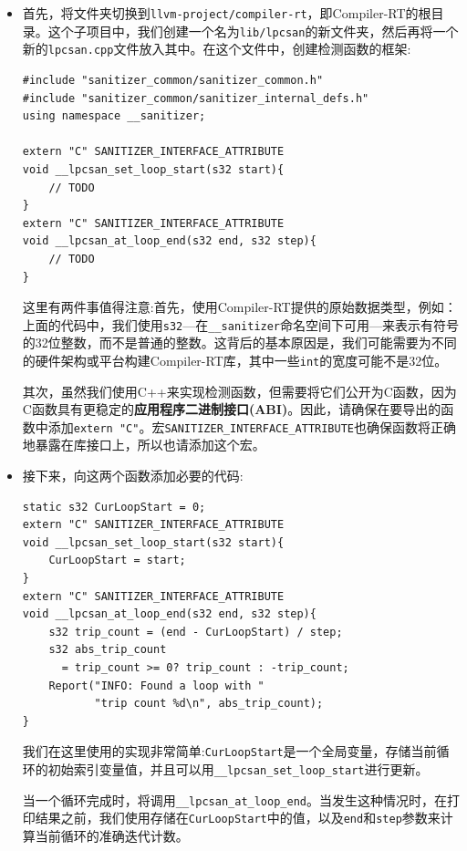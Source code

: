 \begin{itemize}
\item 首先，将文件夹切换到\texttt{llvm-project/compiler-rt}，即Compiler-RT的根目录。这个子项目中，我们创建一个名为\texttt{lib/lpcsan}的新文件夹，然后再将一个新的\texttt{lpcsan.cpp}文件放入其中。在这个文件中，创建检测函数的框架:

\begin{lstlisting}[style=styleCXX]
#include "sanitizer_common/sanitizer_common.h"
#include "sanitizer_common/sanitizer_internal_defs.h"
using namespace __sanitizer;

extern "C" SANITIZER_INTERFACE_ATTRIBUTE
void __lpcsan_set_loop_start(s32 start){
	// TODO
}
extern "C" SANITIZER_INTERFACE_ATTRIBUTE
void __lpcsan_at_loop_end(s32 end, s32 step){
	// TODO
}
\end{lstlisting}

这里有两件事值得注意:首先，使用Compiler-RT提供的原始数据类型，例如：上面的代码中，我们使用\texttt{s32}—在\texttt{\_\_sanitizer}命名空间下可用—来表示有符号的32位整数，而不是普通的整数。这背后的基本原因是，我们可能需要为不同的硬件架构或平台构建Compiler-RT库，其中一些\texttt{int}的宽度可能不是32位。

其次，虽然我们使用C++来实现检测函数，但需要将它们公开为C函数，因为C函数具有更稳定的\textbf{应用程序二进制接口(ABI)}。因此，请确保在要导出的函数中添加\texttt{extern "C"}。宏\texttt{SANITIZER\_INTERFACE\_ATTRIBUTE}也确保函数将正确地暴露在库接口上，所以也请添加这个宏。

\item 接下来，向这两个函数添加必要的代码:

\begin{lstlisting}[style=styleCXX]
static s32 CurLoopStart = 0;
extern "C" SANITIZER_INTERFACE_ATTRIBUTE
void __lpcsan_set_loop_start(s32 start){
	CurLoopStart = start;
}
extern "C" SANITIZER_INTERFACE_ATTRIBUTE
void __lpcsan_at_loop_end(s32 end, s32 step){
	s32 trip_count = (end - CurLoopStart) / step;
	s32 abs_trip_count
	  = trip_count >= 0? trip_count : -trip_count;
	Report("INFO: Found a loop with "
	       "trip count %d\n", abs_trip_count);
}
\end{lstlisting}

我们在这里使用的实现非常简单:\texttt{CurLoopStart}是一个全局变量，存储当前循环的初始索引变量值，并且可以用\texttt{\_\_lpcsan\_set\_loop\_start}进行更新。

当一个循环完成时，将调用\texttt{\_\_lpcsan\_at\_loop\_end}。当发生这种情况时，在打印结果之前，我们使用存储在\texttt{CurLoopStart}中的值，以及\texttt{end}和\texttt{step}参数来计算当前循环的准确迭代计数。


\end{itemize}

